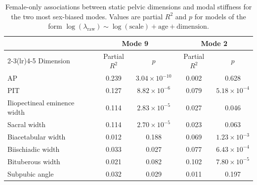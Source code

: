 \documentclass[openacc]{rsproca_new}
\begin{document}
\begin{table}[p]
\centering
\caption{Female-only associations between static pelvic dimensions and modal stiffness for the two most sex-biased modes. Values are partial $R^2$ and $p$ for models of the form $\log(\lambda_{\mathrm{raw}}) \sim \log(\mathrm{scale}) + \mathrm{age} + \mathrm{dimension}$.}
\label{tab:staticassoc}
\begin{tabular}{lcccc}
\toprule
& \multicolumn{2}{c}{Mode 9} & \multicolumn{2}{c}{Mode 2} \\
\cmidrule(lr){2-3}\cmidrule(lr){4-5}
Dimension & Partial $R^2$ & $p$ & Partial $R^2$ & $p$ \\
\midrule
AP & 0.239 & $3.04 \times 10^{-10}$ & 0.002 & 0.628 \\
PIT & 0.127 & $8.82 \times 10^{-6}$ & 0.079 & $5.18 \times 10^{-4}$ \\
Iliopectineal eminence width & 0.114 & $2.83 \times 10^{-5}$ & 0.027 & 0.046 \\
Sacral width & 0.114 & $2.70 \times 10^{-5}$ & 0.023 & 0.063 \\
Biacetabular width & 0.012 & 0.188 & 0.069 & $1.23 \times 10^{-3}$ \\
Biischiadic width & 0.033 & 0.027 & 0.077 & $6.43 \times 10^{-4}$ \\
Bituberous width & 0.021 & 0.082 & 0.102 & $7.80 \times 10^{-5}$ \\
Subpubic angle & 0.032 & 0.029 & 0.011 & 0.197 \\
\bottomrule
\end{tabular}
\end{table}
\end{document}
